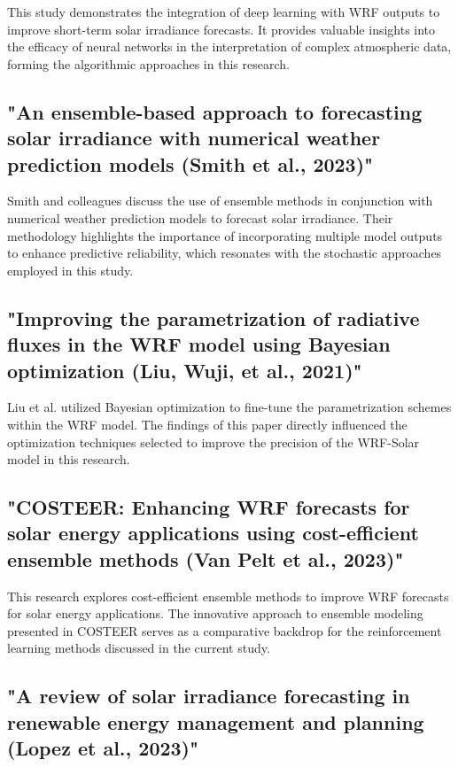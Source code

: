 \documentclass[conference]{IEEEtran}
\begin{document}
This study demonstrates the integration of deep learning with WRF outputs to improve short-term solar irradiance forecasts. It provides valuable insights into the efficacy of neural networks in the interpretation of complex atmospheric data, forming the algorithmic approaches in this research.

\subsection{"An ensemble-based approach to forecasting solar irradiance with numerical weather prediction models (Smith et al., 2023)"}

Smith and colleagues discuss the use of ensemble methods in conjunction with numerical weather prediction models to forecast solar irradiance. Their methodology highlights the importance of incorporating multiple model outputs to enhance predictive reliability, which resonates with the stochastic approaches employed in this study.

\subsection{"Improving the parametrization of radiative fluxes in the WRF model using Bayesian optimization (Liu, Wuji, et al., 2021)"}

Liu et al. utilized Bayesian optimization to fine-tune the parametrization schemes within the WRF model. The findings of this paper directly influenced the optimization techniques selected to improve the precision of the WRF-Solar model in this research.

\subsection{"COSTEER: Enhancing WRF forecasts for solar energy applications using cost-efficient ensemble methods (Van Pelt et al., 2023)"}

This research explores cost-efficient ensemble methods to improve WRF forecasts for solar energy applications. The innovative approach to ensemble modeling presented in COSTEER serves as a comparative backdrop for the reinforcement learning methods discussed in the current study.

\subsection{"A review of solar irradiance forecasting in renewable energy management and planning (Lopez et al., 2023)"}
\end{document}

